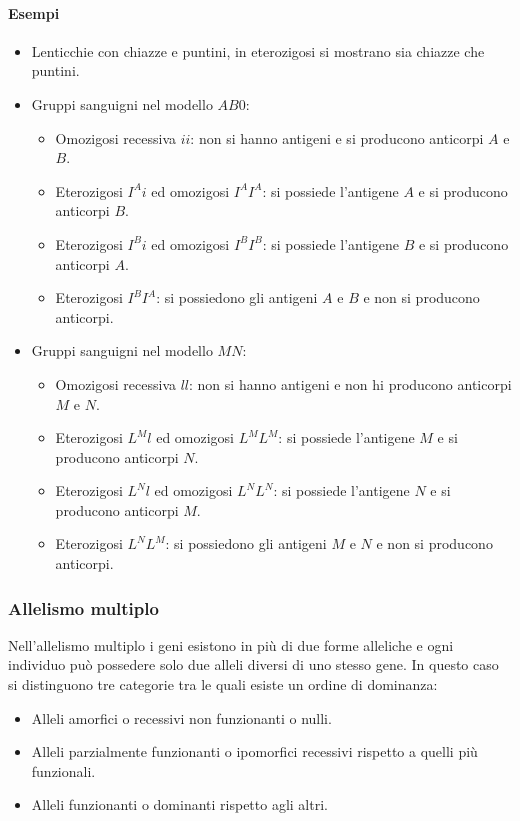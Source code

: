 \paragraph{Esempi}
\begin{itemize}
	\item Lenticchie con chiazze e puntini, in eterozigosi si mostrano sia chiazze che puntini. 
	\item Gruppi sanguigni nel modello $AB0$: 
		\begin{itemize}
			\item Omozigosi recessiva $ii$: non si hanno antigeni e si producono anticorpi $A$ e $B$.
			\item Eterozigosi $I^Ai$ ed omozigosi $I^AI^A$: si possiede l'antigene $A$ e si producono anticorpi $B$.
			\item Eterozigosi $I^Bi$ ed omozigosi $I^BI^B$: si possiede l'antigene $B$ e si producono anticorpi $A$.
			\item Eterozigosi $I^BI^A$: si possiedono gli antigeni $A$ e $B$ e non si producono anticorpi.
		\end{itemize}
	\item Gruppi sanguigni nel modello $MN$:
		\begin{itemize}
			\item Omozigosi recessiva $ll$: non si hanno antigeni e non hi producono anticorpi $M$ e $N$. 
			\item Eterozigosi $L^Ml$ ed omozigosi $L^ML^M$: si possiede l'antigene $M$ e si producono anticorpi $N$.
			\item Eterozigosi $L^Nl$ ed omozigosi $L^NL^N$: si possiede l'antigene $N$ e si producono anticorpi $M$.
			\item Eterozigosi $L^NL^M$: si possiedono gli antigeni $M$ e $N$ e non si producono anticorpi.
		\end{itemize}
\end{itemize}
\subsubsection{Allelismo multiplo}
Nell'allelismo multiplo i geni esistono in pi\`u di due forme alleliche e ogni individuo pu\`o possedere solo due alleli diversi di uno stesso gene. In questo caso si distinguono
tre categorie tra le quali esiste un ordine di dominanza:
\begin{itemize}
	\item Alleli amorfici o recessivi non funzionanti o nulli.
	\item Alleli parzialmente funzionanti o ipomorfici recessivi rispetto a quelli pi\`u funzionali.
	\item Alleli funzionanti o dominanti rispetto agli altri.
\end{itemize}
